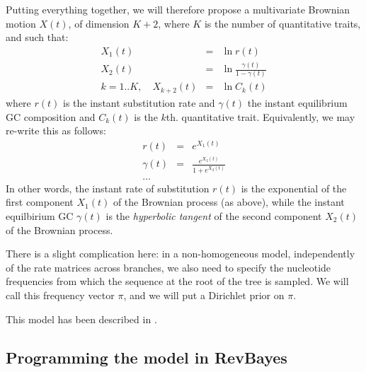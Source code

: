 \documentclass[usletter]{article}
\begin{document}
Putting everything together, we will therefore propose a multivariate Brownian motion $X(t)$, of dimension $K+2$, where $K$ is the number of quantitative traits, and such that:
\begin{eqnarray*}
X_1(t) &=& \ln r(t)
\\
X_2(t) &=& \ln \frac{\gamma(t)}{1 - \gamma(t)}
\\
k=1..K, \quad X_{k+2}(t) &=& \ln C_k(t)
\end{eqnarray*}
where $r(t)$ is the instant substitution rate and $\gamma(t)$ the instant equilibrium GC composition
and $C_k(t)$ is the $k$th. quantitative trait.
Equivalently, we may re-write this as follows:
\begin{eqnarray*}
r(t) &=& e^{X_1(t)}
\\
\gamma(t) &=& \frac{e^{X_2(t)}}{1 + e^{X_2(t)}}
\\
\ldots
\end{eqnarray*}
In other words, the instant rate of substitution $r(t)$ is the exponential of the first component $X_1(t)$ of the Brownian process (as above), while the instant equilbirium GC $\gamma(t)$ is the \emph{hyperbolic tangent} of the second component $X_2(t)$ of the Brownian process.

There is a slight complication here: in a non-homogeneous model, independently of the rate matrices across branches, we also need to specify the nucleotide frequencies from which the sequence at the root of the tree is sampled. We will call this frequency vector $\pi$, and we will put a Dirichlet prior on $\pi$.

This model has been described in \cite{Lartillot:OUn7WLs9}.

\subsection*{Programming the model in RevBayes}
\end{document}
